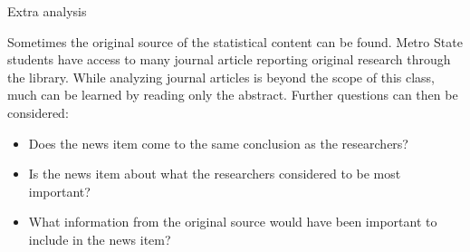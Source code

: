 \documentclass[xcolor=table]{beamer}
\begin{document}
\begin{frame}{Extra analysis}
\begin{block}{}
\large
Sometimes the original source of the statistical content can be found. Metro State students have access to many journal article reporting original research through the library. While analyzing journal articles is beyond the scope of this class, much can be learned by reading only the abstract. Further questions can then be considered:
\begin{itemize}
\item Does the news item come to the same conclusion as the researchers?
\item Is the news item about what the researchers considered to be most important?
\item What information from the original source would have been important to include in the news item?
\end{itemize}
\end{block}
\end{frame}
\end{document}
